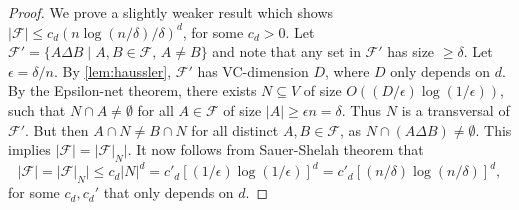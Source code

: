 \documentclass[12pt,reqno]{amsart}
\theoremstyle{definition}
\theoremstyle{remark}
\renewcommand{\leq}{\leqslant}
\renewcommand{\geq}{\geqslant}
\def\F{\mathcal{F}}
\numberwithin{equation}{section}
\begin{document}
\begin{proof}
	We prove a slightly weaker result which shows $|\F| \leq c_d(n\log(n/\delta)/\delta)^d$, for some $c_d > 0$. Let $\F' = \{A \Delta B \mid A, B \in \F, \, A \neq B\}$ and note that any set in $\F'$ has size $\geq \delta$. Let $\epsilon = \delta/n$. By \cref{lem:haussler}, $\F'$ has VC-dimension $D$, where $D$ only depends on $d$. By the Epsilon-net theorem, there exists $N \subseteq V$ of size $O((D/\epsilon)\log(1/\epsilon))$, such that $N \cap A \neq \emptyset$ for all $A \in \F$ of size $|A| \geq \epsilon n = \delta$. Thus $N$ is a transversal of $\F'$. But then $A \cap N \neq B \cap N$ for all distinct $A, B \in \F$, as $N \cap (A \Delta B) \neq \emptyset$. This implies $|\F| = |\F|_N|$. It now follows from Sauer-Shelah theorem that
	\[
		|\F| = |\F|_N| \leq c_d|N|^d = c'_d[(1/\epsilon)\log(1/\epsilon)]^d = c'_d[(n/\delta)\log(n/\delta)]^d,
	\] 
	for some $c_d, c_d'$ that only depends on $d$.
\end{proof}
\end{document}
